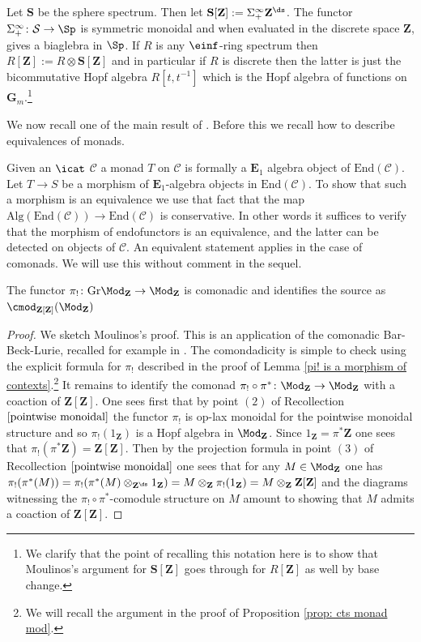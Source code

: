 \documentclass[10pt,reqno]{amsart}
\numberwithin{equation}{section}
\newcommand{\cC}{\mathcal{C}}
\newcommand{\G}{\mathbf{G}}
\newcommand{\ZZ}{\mathbf{Z}}
\newcommand{\End}{\mathrm{End}}
\newcommand{\Gr}{\mathrm{Gr}}
\begin{document}
\begin{notation}
    Let $\mathbf{S}$ be the sphere spectrum. Then let $\mathbf{S}[\ZZ]:=\Sigma_{+}^\infty\ZZ^\ds$. The functor $\Sigma_{+}^\infty\colon \mathcal{S}\to \Sp$ is symmetric monoidal and when evaluated in the discrete space $\ZZ$, gives a biaglebra in $\Sp$. If $R$ is any $\einf$-ring spectrum then $R[\ZZ]:=R\otimes \mathbf{S}[\ZZ]$ and in particular if $R$ is discrete then the latter is just the bicommutative Hopf algebra $R[t,t^{-1}]$  which is the Hopf algebra of functions on $\G_m.$\footnote{We clarify that the point of recalling this notation here is to show that Moulinos's argument for $\mathbf{S}[\ZZ]$ goes through for $R[\ZZ]$ as well by base change.}
\end{notation}
We now recall one of the main result of \cite[Proposition 4.2]{Moulinos2021GeometryOfFiltrations}. Before this we recall how to describe equivalences of monads. 

\begin{remark}\label{remark: how to detect equivalences of monads}
    Given an $\icat$ $\cC$ a monad $T$ on $\cC$ is formally a $\mathbf{E}_1$ algebra object of $\End(\cC).$ Let $T\to S$ be a morphism of $\mathbf{E}_1$-algebra objects in $\End(\cC).$ To show that such a morphism is an equivalence we use that fact that the map $\mathrm{Alg}(\End(\cC))\to \End(\cC)$ is conservative. In other words it suffices to verify that the morphism of endofunctors is an equivalence, and the latter can be detected on objects of $\cC.$ An equivalent statement applies in the case of comonads. We will use this without comment in the sequel.
\end{remark}

\begin{proposition}[Moulinos]\label{Moulinos's coaction}
    The functor $\pi_!\colon \Gr\Mod_\ZZ\to \Mod_\ZZ$ is comonadic and identifies the source as $\cmod_{\ZZ[\ZZ]}(\Mod_\ZZ)$
\end{proposition}
\begin{proof}
We sketch Moulinos's proof.
This is an application of the comonadic Bar-Beck-Lurie, recalled for example in \cite[Theorem 4.4]{Moulinos2021GeometryOfFiltrations}. 
The comondadicity is simple to check using the explicit formula for $\pi_!$ described in the proof of Lemma \ref{pi! is a morphism of contexts}.\footnote{We will recall the argument in the proof of Proposition \ref{prop: cts monad mod}.}
It remains to identify the comonad $\pi_!\circ \pi^*\colon \Mod_\ZZ\to \Mod_\ZZ$ with a coaction of $\ZZ[\ZZ]$. One sees first that by point $(2)$ of Recollection $\ref{pointwise monoidal}$ the functor $\pi_!$ is op-lax monoidal for the pointwise monoidal structure and so $\pi_!(1_\ZZ)$ is a Hopf algebra in $\Mod_\ZZ$. Since $1_\ZZ=\pi^*\ZZ$ one sees that $\pi_!(\pi^*\ZZ)=\ZZ[\ZZ]$. 
Then by the projection formula in point $(3)$ of Recollection $\ref{pointwise monoidal}$ one sees that for any $M\in \Mod_\ZZ$ one has $\pi_!(\pi^*(M))=\pi_!(\pi^*(M)\otimes_{\ZZ^\ds}1_\ZZ)= M\otimes_\ZZ \pi_!(1_\ZZ)=M\otimes_\ZZ\ZZ[\ZZ]$ and the diagrams witnessing the $\pi_!\circ \pi^*$-comodule structure on $M$ amount to showing that $M$ admits a coaction of $\ZZ[\ZZ].$
\end{proof}
\end{document}

